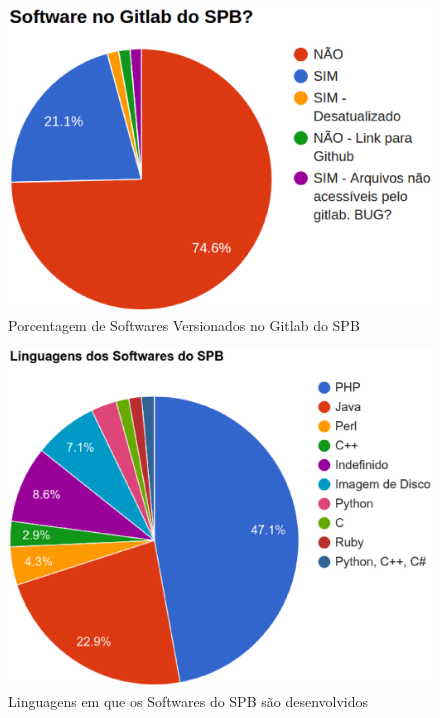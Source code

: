 \begin{figure}[!htb]
	\centering
    \includegraphics[keepaspectratio=true,scale=0.45]
    {figuras/is_software_gitlab_spb.eps}
  \caption{Porcentagem de Softwares Versionados no Gitlab do SPB}
  \label{fig:is_software_gitlab_spb}
\end{figure}

\begin{figure}[!htb]
	\centering
    \includegraphics[keepaspectratio=true,scale=0.5]
    {figuras/linguagens_softwares_spb_v2.eps}
  \caption{Linguagens em que os Softwares do SPB são desenvolvidos}
  \label{fig:linguagens_softwares_spb_v2}
\end{figure}

